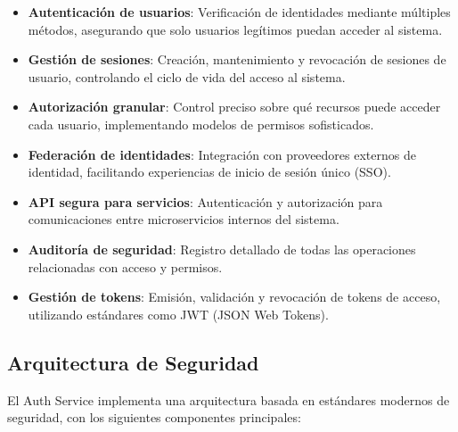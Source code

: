 \documentclass[12pt,a4paper]{article}
\begin{document}
\begin{itemize}
    \item \textbf{Autenticación de usuarios}: Verificación de identidades mediante múltiples métodos, asegurando que solo usuarios legítimos puedan acceder al sistema.
    
    \item \textbf{Gestión de sesiones}: Creación, mantenimiento y revocación de sesiones de usuario, controlando el ciclo de vida del acceso al sistema.
    
    \item \textbf{Autorización granular}: Control preciso sobre qué recursos puede acceder cada usuario, implementando modelos de permisos sofisticados.
    
    \item \textbf{Federación de identidades}: Integración con proveedores externos de identidad, facilitando experiencias de inicio de sesión único (SSO).
    
    \item \textbf{API segura para servicios}: Autenticación y autorización para comunicaciones entre microservicios internos del sistema.
    
    \item \textbf{Auditoría de seguridad}: Registro detallado de todas las operaciones relacionadas con acceso y permisos.
    
    \item \textbf{Gestión de tokens}: Emisión, validación y revocación de tokens de acceso, utilizando estándares como JWT (JSON Web Tokens).
\end{itemize}

\subsection{Arquitectura de Seguridad}
\label{subsec:as-arquitectura}

El Auth Service implementa una arquitectura basada en estándares modernos de seguridad, con los siguientes componentes principales:
\end{document}
